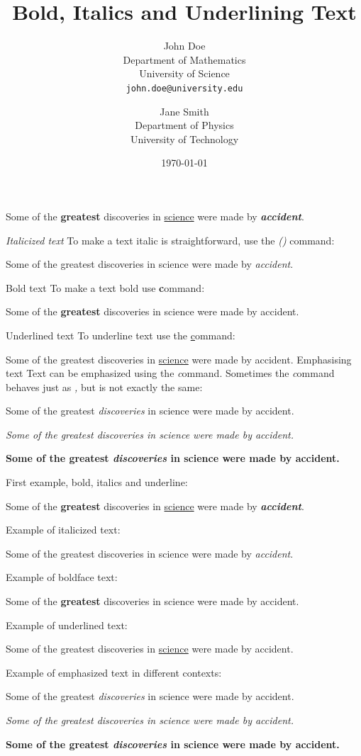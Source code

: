 \documentclass{article}
\title{\Large Bold, Italics and Underlining Text}
\author{
	John Doe \\
	Department of Mathematics \\
	University of Science \\
	\texttt{john.doe@university.edu}
	\and
	Jane Smith \\
	Department of Physics \\
	University of Technology
}
\date{\today}
\begin{document}
	
	\maketitle
	
	Some of the \textbf{greatest} 
	discoveries in \underline{science} 
	were made by \textbf{\textit{accident}}.
	
	\textit{Italicized text}
	To make a text italic is straightforward, use the \textit (\emph) command:
	
	Some of the greatest 
	discoveries in science 
	were made by \textit{accident}.
	
	Bold text
	To make a text bold use \textbf command:
	
	Some of the \textbf{greatest} 
	discoveries in science 
	were made by accident.
	
	Underlined text
	To underline text use the \underline command:
	
	Some of the greatest 
	discoveries in \underline{science} 
	were made by accident.
	Emphasising text
	Text can be emphasized using the \emph command. Sometimes the \emph command behaves just as \textit, but is not exactly the same:
	
	Some of the greatest \emph{discoveries} 
	in science 
	were made by accident.
	
	\textit{Some of the greatest \emph{discoveries} 
		in science 
		were made by accident.}
	
	\textbf{Some of the greatest \emph{discoveries} 
		in science 
		were made by accident.}
		
	First example, bold, italics and underline:
	
	Some of the \textbf{greatest} discoveries in \underline{science} were made by \textbf{\emph{accident}}.
	
	\vspace{1.5cm}
	
	Example of italicized text: 
	
	Some of the greatest discoveries in science were made by \emph{accident}.
	
	\vspace{1.5cm}
	
	Example of boldface text:
	
	Some of the \textbf{greatest} discoveries in science were made by accident.
	
	\vspace{1.5cm}
	
	Example of underlined text:
	
	Some of the greatest discoveries in \underline{science} were made by accident.
	
	\vspace{1.5cm}
	
	Example of emphasized text in different contexts:
	
	Some of the greatest \emph{discoveries} in science were made by accident.
	
	\textit{Some of the greatest \emph{discoveries} in science were made by accident.}
	
	\textbf{Some of the greatest \emph{discoveries} in science were made by accident.}
	
\end{document}

